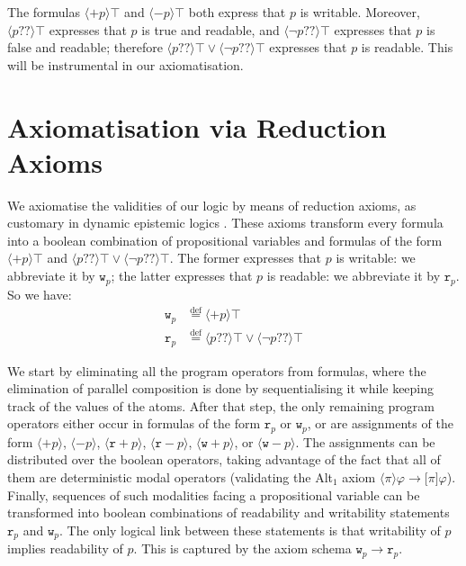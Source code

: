 \documentclass{llncs}
\newcommand{\readable}[1]{\mathtt{r}_{#1}}
\newcommand{\writable}[1]{\mathtt{w}_{#1}}
\newcommand{\testendo}{?\!\!?}			%
\newcommand{\assgntopR}[1]{{\mathtt r {+} #1}}
\newcommand{\assgnbotR}[1]{{\mathtt r {-} #1}}
\newcommand{\assgntopW}[1]{{\mathtt w {+} #1}}
\newcommand{\assgnbotW}[1]{{\mathtt w {-} #1}}
\newcommand{\assgntopV}[1]{{\mathtt {+} #1}}
\newcommand{\assgnbotV}[1]{{\mathtt {-} #1}}
\newcommand{\eqdef}{\stackrel{\text{def}}{=}}
\newcommand{\lbox}[1]{ \big[ #1 \big] }
\newcommand{\ldia}[1]{ \big\langle #1 \big\rangle}
\newcommand{\leqv}{ \leftrightarrow }
\newcommand{\limp}{ \rightarrow }
\newcommand{\ndet}{\,{\cup}\,}
\renewcommand{\phi}{\varphi}
\begin{document}
The formulas $\ldia{ \assgntopV p } \top $ and $\ldia{ \assgnbotV p } \top $ both express that $p$ is writable. 
Moreover, $\ldia{ p \testendo} \top $ expresses that $p$ is true and readable, and 
$\ldia{ \lnot p \testendo} \top $ expresses that $p$ is false and readable;
therefore $\ldia{ p \testendo} \top \lor \ldia{ \lnot p \testendo} \top $ 
expresses that $p$ is readable. 
This will be instrumental in our axiomatisation. 

\section{Axiomatisation via Reduction Axioms}\label{sec:axiomatisation}

We axiomatise the validities of our logic by means of reduction axioms, as customary in dynamic epistemic logics \cite{DitmarschHoekKooi07}. 
These axioms transform every formula into a boolean combination of propositional variables
and formulas of the form
$\ldia{ \assgntopV p } \top $ and 
$\ldia{ p \testendo} \top \lor \ldia{ \lnot p \testendo} \top $. 
The former expresses that $p$ is writable: we abbreviate it by $\writable{p}$;
the latter expresses that $p$ is readable: we abbreviate it by $\readable p$. 
So we have:
\begin{align*}
\writable{p} &\eqdef \ldia{ \assgntopV p } \top 
\\
\readable p &\eqdef \ldia{ p \testendo} \top \lor \ldia{ \lnot p \testendo} \top 
\end{align*}

We start by eliminating all the program operators from formulas, where 
the elimination of parallel composition is done by sequentialising it while keeping track of the values of the atoms. 
After that step, the only remaining program operators 
either occur in formulas of the form $\readable p$ or $\writable p$, 
or are assignments of the form
$\ldia{ \assgntopV p} $,
$\ldia{ \assgnbotV p} $,
$\ldia{ \assgntopR p} $,
$\ldia{ \assgnbotR p} $,
$\ldia{ \assgntopW p} $, or
$\ldia{ \assgnbotW p} $. 
The assignments can be distributed over the boolean operators, taking advantage of the fact that all of them are deterministic modal operators 
(validating the Alt$_1$ axiom $\ldia \pi \phi \limp \lbox \pi \phi$). 
Finally, sequences of such modalities facing a propositional variable can be transformed into 
boolean combinations of readability and writability statements $\readable p$ and $\writable p$.
The only logical link between these statements is that 
writability of $p$ implies readability of $p$. 
This is captured by the axiom schema 
$\writable p \limp \readable p$.
\end{document}
